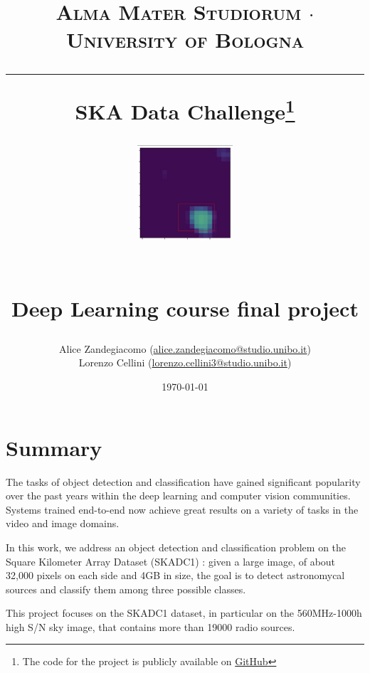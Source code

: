 \documentclass[a4paper,10pt]{report}
\begin{document}
\frenchspacing

\title{
  {{\large{\textsc{Alma Mater Studiorum $\cdot$ University of Bologna}}}}
  \rule{\textwidth}{0.4pt}\vspace{3mm}
  \textbf{SKA Data Challenge\footnote{The code for the project is publicly available on \href{https://github.com/Lorenz92/SKADC1}{GitHub}}}
  \begin{figure}[!htb]
    \centering
    \includegraphics[width = 100pt]{nice-detection}
  \end{figure} \\
  Deep Learning course final project
}

\author{Alice Zandegiacomo (\href{mailto:alice.zandegiacomo@studio.unibo.it}{alice.zandegiacomo@studio.unibo.it}) \\ Lorenzo Cellini (\href{mailto:lorenzo.cellini3@studio.unibo.it}{lorenzo.cellini3@studio.unibo.it})}
\date{\today}
\maketitle
\newpage
\tableofcontents
\setcounter{tocdepth}{1}
\newpage


\chapter{Summary}\label{chap:introduction}

The tasks of object detection and classification have gained significant popularity over the past years within the deep learning and computer vision communities. Systems trained end-to-end now achieve great results on a variety of tasks in the video and image domains.

In this work, we address an object detection and classification problem on the Square Kilometer Array Dataset (SKADC1) \cite{ska-site}: given a large image, of about 32,000 pixels on each side and 4GB in size, the goal is to detect astronomycal sources and classify them among three possible classes.

This project focuses on the SKADC1 dataset, in particular on the 560MHz-1000h high S/N sky image, that contains more than \num{19000} radio sources.
\end{document}
